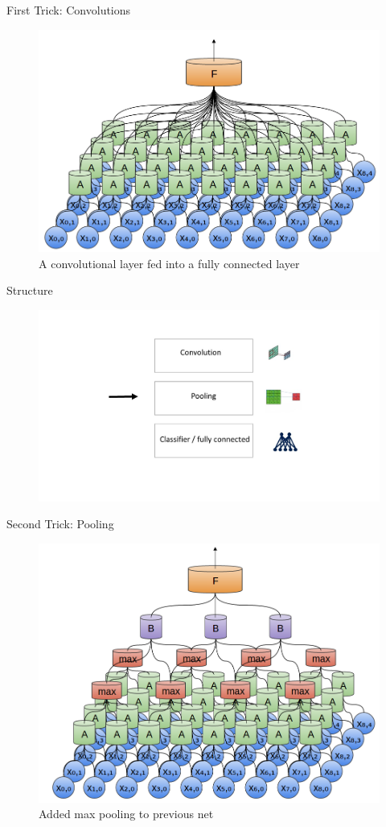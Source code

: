 \documentclass[12pt]{beamer}
\begin{document}
\begin{frame}{First Trick: Convolutions}
\begin{figure}
\includegraphics[width = 0.8\linewidth]{images/convnet.png}
\caption{A convolutional layer fed into a fully connected layer}
\label{fig:principle}
\end{figure}
\end{frame}

\begin{frame}{Structure}
\begin{figure}
\includegraphics[width = 1\linewidth]{images/struct2.jpg}
\label{fig:principle}
\end{figure}
\end{frame}

\begin{frame}{Second Trick: Pooling}
\begin{figure}
\includegraphics[width = 0.7\linewidth]{images/conv3.png}
\caption{Added max pooling to previous net}
\label{fig:principle}
\end{figure}

\end{frame}
\end{document}
